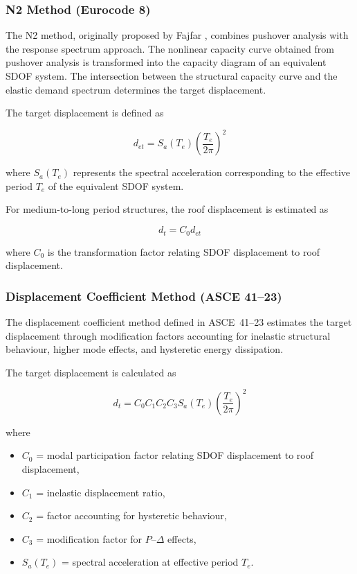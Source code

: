 \documentclass[fleqn,10pt]{wlscirep}
\begin{document}
\subsubsection{N2 Method (Eurocode 8)}

The N2 method, originally proposed by Fajfar \cite{Fajfar2000N2}, combines pushover analysis with the response spectrum approach. 
The nonlinear capacity curve obtained from pushover analysis is transformed into the capacity diagram of an equivalent SDOF system. 
The intersection between the structural capacity curve and the elastic demand spectrum determines the target displacement.

The target displacement is defined as

\begin{equation}
d_{et} = S_a(T_e)\left(\frac{T_e}{2\pi}\right)^2
\end{equation}

where $S_a(T_e)$ represents the spectral acceleration corresponding to the effective period $T_e$ of the equivalent SDOF system.

For medium-to-long period structures, the roof displacement is estimated as

\begin{equation}
d_t = C_0 d_{et}
\end{equation}

where $C_0$ is the transformation factor relating SDOF displacement to roof displacement.

\subsubsection{Displacement Coefficient Method (ASCE 41--23)}

The displacement coefficient method defined in ASCE~41--23 estimates the target displacement through modification factors accounting for inelastic structural behaviour, higher mode effects, and hysteretic energy dissipation.

The target displacement is calculated as

\begin{equation}
d_t = C_0 C_1 C_2 C_3 S_a(T_e)\left(\frac{T_e}{2\pi}\right)^2
\end{equation}

where

\begin{itemize}
\item $C_0$ = modal participation factor relating SDOF displacement to roof displacement,
\item $C_1$ = inelastic displacement ratio,
\item $C_2$ = factor accounting for hysteretic behaviour,
\item $C_3$ = modification factor for $P$--$\Delta$ effects,
\item $S_a(T_e)$ = spectral acceleration at effective period $T_e$.
\end{itemize}
\end{document}
